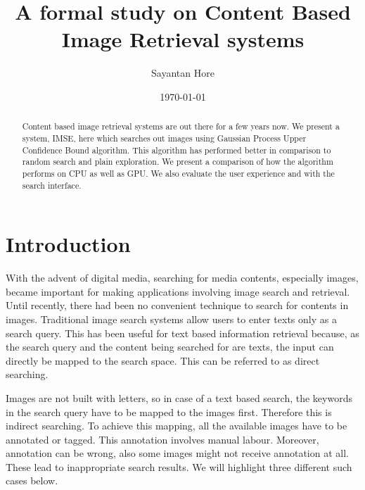 \documentclass[english]{tktltiki}
\begin{document}
\onehalfspacing

\title{A formal study on Content Based Image Retrieval systems}
\author{Sayantan Hore}
\date{\today}

\maketitle



\begin{abstract}

Content based image retrieval systems are out there for a few years now. We present a system, IMSE, here which searches out images using Gaussian Process Upper Confidence Bound algorithm. This algorithm has performed better in comparison to random search and plain exploration. We present a comparison of how the algorithm performs on CPU as well as GPU. We also evaluate the user experience and with the search interface.

\end{abstract}

\mytableofcontents




\section{Introduction}

With the advent of digital media, searching for media contents, especially images, became important for making applications involving image search and retrieval. Until recently, there had been no convenient technique to search for contents in images. Traditional image search systems allow users to enter texts only as a search query. This has been useful for text based information retrieval because, as the search query and the content being searched for are texts, the input can directly be mapped to the search space. This can be referred to as direct searching.

Images are not built with letters, so in case of a text based search, the keywords in the search query have to be mapped to the images first. Therefore this is indirect searching. To achieve this mapping, all the available images have to be annotated or tagged. This annotation involves manual labour. Moreover, annotation can be wrong, also some images might not receive annotation at all. These lead to inappropriate search results. We will highlight three different such cases below.
\end{document}

